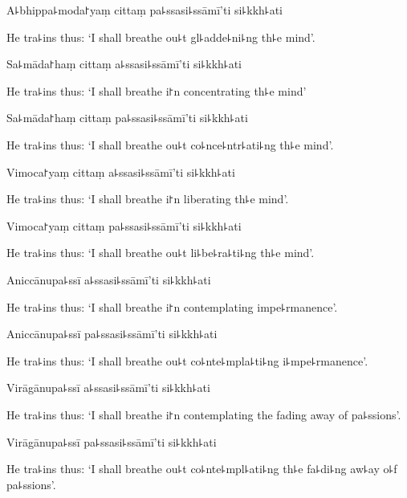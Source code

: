 A꜕bhippa꜕moda꜓yaṃ cittaṃ pa꜕ssasi꜕ssāmī'ti si꜕kkh꜕ati

\begin{english}
  He tra꜕ins thus: `I shall breathe ou꜕t gl꜕adde꜕ni꜕ng th꜕e mind'.
\end{english}

Sa꜕māda꜓haṃ cittaṃ a꜕ssasi꜕ssāmī'ti si꜕kkh꜕ati

\begin{english}
  He tra꜕ins thus: `I shall breathe i꜓n concentrating th꜕e mind'
\end{english}

Sa꜕māda꜓haṃ cittaṃ pa꜕ssasi꜕ssāmī'ti si꜕kkh꜕ati

\begin{english}
  He tra꜕ins thus: `I shall breathe ou꜕t co꜕nce꜕ntr꜕ati꜕ng th꜕e mind'.
\end{english}

Vimoca꜓yaṃ cittaṃ a꜕ssasi꜕ssāmī'ti si꜕kkh꜕ati

\begin{english}
  He tra꜕ins thus: `I shall breathe i꜓n liberating th꜕e mind'.
\end{english}

Vimoca꜓yaṃ cittaṃ pa꜕ssasi꜕ssāmī'ti si꜕kkh꜕ati

\begin{english}
  He tra꜕ins thus: `I shall breathe ou꜕t li꜕be꜕ra꜕ti꜕ng th꜕e mind'.
\end{english}

Aniccānupa꜕ssī a꜕ssasi꜕ssāmī'ti si꜕kkh꜕ati

\begin{english}
  He tra꜕ins thus: `I shall breathe i꜓n contemplating impe꜕rmanence'.
\end{english}

Aniccānupa꜕ssī pa꜕ssasi꜕ssāmī'ti si꜕kkh꜕ati

\begin{english}
  He tra꜕ins thus: `I shall breathe ou꜕t co꜕nte꜕mpla꜕ti꜕ng i꜕mpe꜕rmanence'.
\end{english}

Virāgānupa꜕ssī a꜕ssasi꜕ssāmī'ti si꜕kkh꜕ati

\begin{english}
  He tra꜕ins thus: `I shall breathe i꜓n contemplating the fading away of pa꜕ssions'.
\end{english}

Virāgānupa꜕ssī pa꜕ssasi꜕ssāmī'ti si꜕kkh꜕ati

\begin{english}
  He tra꜕ins thus: `I shall breathe ou꜕t co꜕nte꜕mpl꜕ati꜕ng th꜕e fa꜕di꜕ng aw꜕ay o꜕f pa꜕ssions'.
\end{english}

